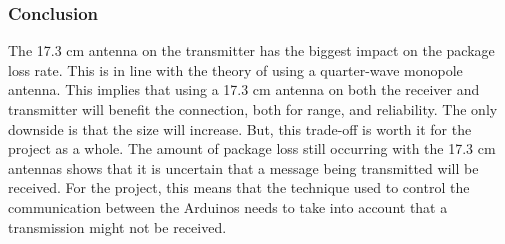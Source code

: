 \subsubsection*{Conclusion}
The 17.3 cm antenna on the transmitter has the biggest impact on the package loss rate.
This is in line with the theory of using a quarter-wave monopole antenna.
This implies that using a 17.3 cm antenna on both the receiver and transmitter will benefit the connection, both for range, and reliability.
The only downside is that the size will increase.
But, this trade-off is worth it for the project as a whole.
The amount of package loss still occurring with the 17.3 cm antennas shows that it is uncertain that a message being transmitted will be received.
For the project, this means that the technique used to control the communication between the Arduinos needs to take into account that a transmission might not be received.
